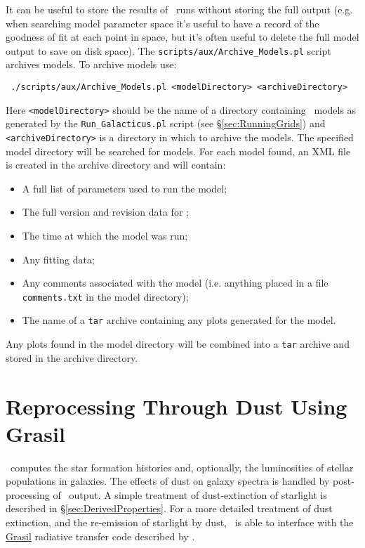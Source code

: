 It can be useful to store the results of \glc\ runs without storing the full output (e.g. when searching model parameter space it's useful to have a record of the goodness of fit at each point in space, but it's often useful to delete the full model output to save on disk space). The {\tt scripts/aux/Archive\_Models.pl} script archives models. To archive models use:
\begin{verbatim}
 ./scripts/aux/Archive_Models.pl <modelDirectory> <archiveDirectory>
\end{verbatim}
Here {\tt <modelDirectory>} should be the name of a directory containing \glc\ models as generated by the {\tt Run\_Galacticus.pl} script (see \S\ref{sec:RunningGrids}) and {\tt <archiveDirectory>} is a directory in which to archive the models. The specified model directory will be searched for models. For each model found, an XML file is created in the archive directory and will contain:
\begin{itemize}
 \item A full list of parameters used to run the model;
 \item The full version and revision data for \glc;
 \item The time at which the model was run;
 \item Any fitting data;
 \item Any comments associated with the model (i.e. anything placed in a file {\tt comments.txt} in the model directory);
 \item The name of a {\tt tar} archive containing any plots generated for the model.
\end{itemize}
Any plots found in the model directory will be combined into a {\tt tar} archive and stored in the archive directory.

\section{Reprocessing Through Dust Using {\sc Grasil}}\label{sec:Grasil}

\glc\ computes the star formation histories and, optionally, the luminosities of stellar populations in galaxies. The effects of dust on galaxy spectra is handled by post-processing of \glc\ output. A simple treatment of dust-extinction of starlight is described in \S\ref{sec:DerivedProperties}. For a more detailed treatment of dust extinction, and the re-emission of starlight by dust, \glc\ is able to interface with the \href{http://adlibitum.oat.ts.astro.it/silva/grasil/grasil.html}{{\sc Grasil}} radiative transfer code described by \cite{silva_modeling_1998}.

